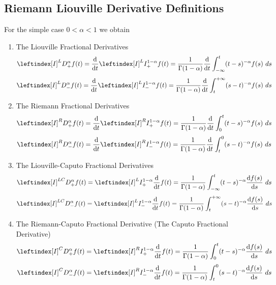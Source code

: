 \subsection{Riemann Liouville Derivative Definitions}
For the simple case $0 < \alpha < 1$ we obtain
\begin{enumerate}
        \item The Liouville Fractional Derivatives
        \begin{equation}
            \leftindex[I]^L {D_{+}^{\alpha}} f(t) = \dv{}{t} \leftindex[I]^L {I_{+}^{1-\alpha}} f(t) = \frac{1}{\Gamma(1-\alpha)} \dv{}{t} \int_{-\infty}^{t} (t-s)^{-\alpha}f(s) \hquad ds
        \end{equation}
        \begin{equation}
            \leftindex[I]^L {D_{-}^{\alpha}} f(t) = \dv{}{t} \leftindex[I]^L {I_{-}^{1-\alpha}} f(t) = \frac{1}{\Gamma(1-\alpha)} \dv{}{t} \int_{t}^{+\infty} (s-t)^{-\alpha}f(s) \hquad ds
        \end{equation}
        \item The Riemann Fractional Derivatives
        \begin{equation}
            \leftindex[I]^R {D_{+}^{\alpha}} f(t) = \dv{}{t} \leftindex[I]^R {I_{+}^{1-\alpha}} f(t) = \frac{1}{\Gamma(1-\alpha)} \dv{}{t} \int_{0}^{t} (t-s)^{-\alpha}f(s) \hquad ds
        \end{equation}
        \begin{equation}
            \leftindex[I]^R {D_{-}^{\alpha}} f(t) = \dv{}{t} \leftindex[I]^R {I_{-}^{1-\alpha}} f(t) = \frac{1}{\Gamma(1-\alpha)} \dv{}{t} \int_{t}^{0} (s-t)^{-\alpha}f(s) \hquad ds
        \end{equation}
        \item The Liouville-Caputo Fractional Derivatives
        \begin{equation}
            \leftindex[I]^{LC} {D_{+}^{\alpha}} f(t) = \leftindex[I]^L {I_{+}^{1-\alpha}} \dv{}{t} f(t) = \frac{1}{\Gamma(1-\alpha)}  \int_{-\infty}^{t} (t-s)^{-\alpha} \dv{f(s)}{s}  \hquad ds
        \end{equation}
        \begin{equation}
            \leftindex[I]^{LC} {D_{-}^{\alpha}} f(t) = \leftindex[I]^L {I_{-}^{1-\alpha}} \dv{}{t} f(t) = \frac{1}{\Gamma(1-\alpha)} \int_{t}^{+\infty} (s-t)^{-\alpha} \dv{f(s)}{s} \hquad ds
        \end{equation}
        \item The Riemann-Caputo Fractional Derivative (The Caputo Fractional Derivative)
        \begin{equation}
            \leftindex[I]^{C} {D_{+}^{\alpha}} f(t) = \leftindex[I]^R {I_{+}^{1-\alpha}} \dv{}{t} f(t) = \frac{1}{\Gamma(1-\alpha)}  \int_{0}^{t} (t-s)^{-\alpha} \dv{f(s)}{s}  \hquad ds
        \end{equation}
        \begin{equation}
            \leftindex[I]^{C} {D_{-}^{\alpha}} f(t) = \leftindex[I]^R {I_{-}^{1-\alpha}} \dv{}{t} f(t) = \frac{1}{\Gamma(1-\alpha)} \int_{t}^{0} (s-t)^{-\alpha} \dv{f(s)}{s} \hquad ds
        \end{equation}
\end{enumerate}
